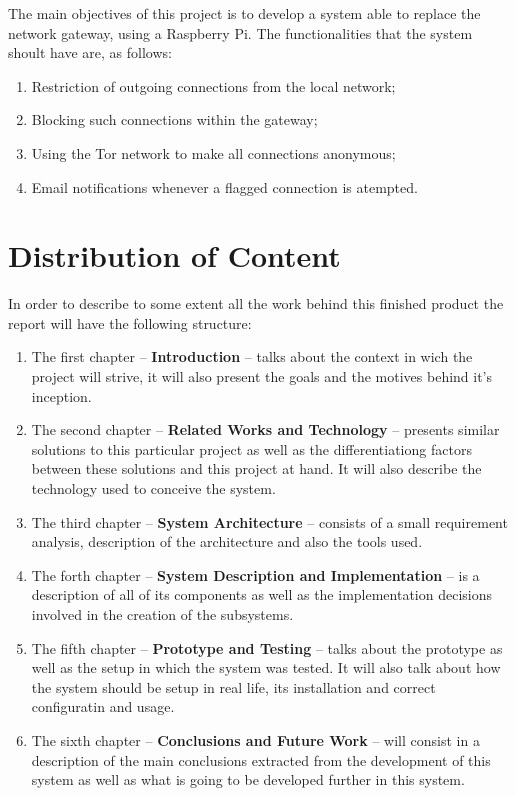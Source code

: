The main objectives of this project is to develop a system able to replace the
network gateway, using a Raspberry Pi. The functionalities that the system
shoult have are, as follows:
\begin{enumerate}
	\item Restriction of outgoing connections from the local network;
	\item Blocking such connections within the gateway;
	\item Using the Tor network to make all connections anonymous;
	\item Email notifications whenever a flagged connection is atempted.
\end{enumerate}

\section{Distribution of Content}
\label{sec:organ}
In order to describe to some extent all the work behind this finished product
the report will have the following structure:
\begin{enumerate}
	\item The first chapter -- \textbf{Introduction} -- talks about the context
		in wich the project will strive, it will also present the goals and the
		motives behind it's inception.
	\item The second chapter -- \textbf{Related Works and Technology} --
		presents similar solutions to this particular project as well as the
		differentiationg factors between these solutions and this project at
		hand. It will also describe the technology used to conceive the system.
	\item The third chapter -- \textbf{System Architecture} -- consists of a
		small requirement analysis, description of the architecture and also the
		tools used.
	\item The forth chapter -- \textbf{System Description and Implementation} --
		is a description of all of its components as well as the implementation
		decisions involved in the creation of the subsystems.
	\item The fifth chapter -- \textbf{Prototype and Testing} -- talks about the
		prototype as well as the setup in which the system was tested. It will
		also talk about how the system should be setup in real life, its
		installation and correct configuratin and usage.
	\item The sixth chapter -- \textbf{Conclusions and Future Work} -- will
		consist in a description of the main conclusions extracted from the
		development of this system as well as what is going to be developed
		further in this system.
\end{enumerate}

